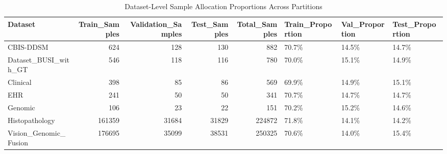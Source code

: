 \begin{table}
\caption{Dataset-Level Sample Allocation Proportions Across Partitions}
\label{tab:table_dataset_allocation_summary}
\begin{tabular}{lrrrrlll}
\toprule
Dataset & Train\_Samples & Validation\_Samples & Test\_Samples & Total\_Samples & Train\_Proportion & Val\_Proportion & Test\_Proportion \\
\midrule
CBIS-DDSM & 624 & 128 & 130 & 882 & 70.7\% & 14.5\% & 14.7\% \\
Dataset\_BUSI\_with\_GT & 546 & 118 & 116 & 780 & 70.0\% & 15.1\% & 14.9\% \\
Clinical & 398 & 85 & 86 & 569 & 69.9\% & 14.9\% & 15.1\% \\
EHR & 241 & 50 & 50 & 341 & 70.7\% & 14.7\% & 14.7\% \\
Genomic & 106 & 23 & 22 & 151 & 70.2\% & 15.2\% & 14.6\% \\
Histopathology & 161359 & 31684 & 31829 & 224872 & 71.8\% & 14.1\% & 14.2\% \\
Vision\_Genomic\_Fusion & 176695 & 35099 & 38531 & 250325 & 70.6\% & 14.0\% & 15.4\% \\
\bottomrule
\end{tabular}
\end{table}

